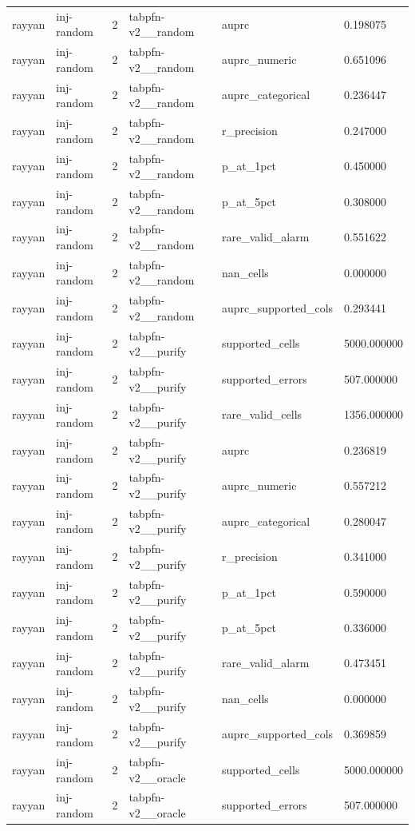 \begin{tabular}{llllll}
rayyan & inj-random & 2 & tabpfn-v2\_\_random & auprc & 0.198075 \\
rayyan & inj-random & 2 & tabpfn-v2\_\_random & auprc\_numeric & 0.651096 \\
rayyan & inj-random & 2 & tabpfn-v2\_\_random & auprc\_categorical & 0.236447 \\
rayyan & inj-random & 2 & tabpfn-v2\_\_random & r\_precision & 0.247000 \\
rayyan & inj-random & 2 & tabpfn-v2\_\_random & p\_at\_1pct & 0.450000 \\
rayyan & inj-random & 2 & tabpfn-v2\_\_random & p\_at\_5pct & 0.308000 \\
rayyan & inj-random & 2 & tabpfn-v2\_\_random & rare\_valid\_alarm & 0.551622 \\
rayyan & inj-random & 2 & tabpfn-v2\_\_random & nan\_cells & 0.000000 \\
rayyan & inj-random & 2 & tabpfn-v2\_\_random & auprc\_supported\_cols & 0.293441 \\
rayyan & inj-random & 2 & tabpfn-v2\_\_purify & supported\_cells & 5000.000000 \\
rayyan & inj-random & 2 & tabpfn-v2\_\_purify & supported\_errors & 507.000000 \\
rayyan & inj-random & 2 & tabpfn-v2\_\_purify & rare\_valid\_cells & 1356.000000 \\
rayyan & inj-random & 2 & tabpfn-v2\_\_purify & auprc & 0.236819 \\
rayyan & inj-random & 2 & tabpfn-v2\_\_purify & auprc\_numeric & 0.557212 \\
rayyan & inj-random & 2 & tabpfn-v2\_\_purify & auprc\_categorical & 0.280047 \\
rayyan & inj-random & 2 & tabpfn-v2\_\_purify & r\_precision & 0.341000 \\
rayyan & inj-random & 2 & tabpfn-v2\_\_purify & p\_at\_1pct & 0.590000 \\
rayyan & inj-random & 2 & tabpfn-v2\_\_purify & p\_at\_5pct & 0.336000 \\
rayyan & inj-random & 2 & tabpfn-v2\_\_purify & rare\_valid\_alarm & 0.473451 \\
rayyan & inj-random & 2 & tabpfn-v2\_\_purify & nan\_cells & 0.000000 \\
rayyan & inj-random & 2 & tabpfn-v2\_\_purify & auprc\_supported\_cols & 0.369859 \\
rayyan & inj-random & 2 & tabpfn-v2\_\_oracle & supported\_cells & 5000.000000 \\
rayyan & inj-random & 2 & tabpfn-v2\_\_oracle & supported\_errors & 507.000000 \\

\end{tabular}
